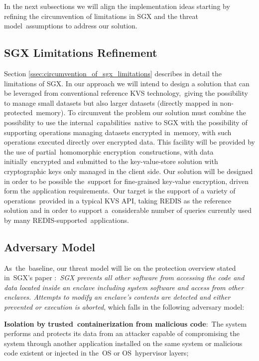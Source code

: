 In the next subsections we will align the implementation ideas starting by refining the circumvention of limitations in SGX and the threat model assumptions to address our solution.

\subsection{\gls{SGX} Limitations Refinement}
\label{ssec:sgx_limitations_refinement}

Section \ref{ssec:circumvention_of_sgx_limitations} describes in detail the limitations of \gls{SGX}. In our approach we will intend to design a solution that can be leveraged from conventional reference KVS technology, giving the possibility to manage small datasets but also larger datasets (directly mapped in non-protected memory). To circumvent the problem our solution must combine the possibility to use the internal capabilities native to SGX with the possibility of supporting operations managing datasets encrypted in memory, with such operations executed directly over encrypted data. This facility will be provided by the use of partial homomorphic encryption constructions, with data initially encrypted and submitted to the key-value-store solution with cryptographic keys only managed in the client side. Our solution will be designed in order to be possible the support for fine-grained key-value encryption, driven form the application requirements. Our target is the support of a variety of operations provided in a typical KVS API, taking REDIS as the reference solution and in order to support a considerable number of queries currently used by many REDIS-supported applications.

\subsection{Adversary Model}
\label{ssec:adversary_model}

As the baseline, our threat model will lie on the protection overview stated in SGX’s paper \cite{sgx:7}: \textit{SGX prevents all other software from accessing the code and data located inside an enclave including system software and access from other enclaves. Attempts to modify an enclave’s contents are detected and either prevented or execution is aborted}, which falls in the following adversary model:

\textbf{Isolation by trusted containerization from malicious code}: The system performs and protects its data from an attacker capable of compromising the system through another application installed on the same system or malicious code existent or injected in the OS or OS hypervisor layers;

